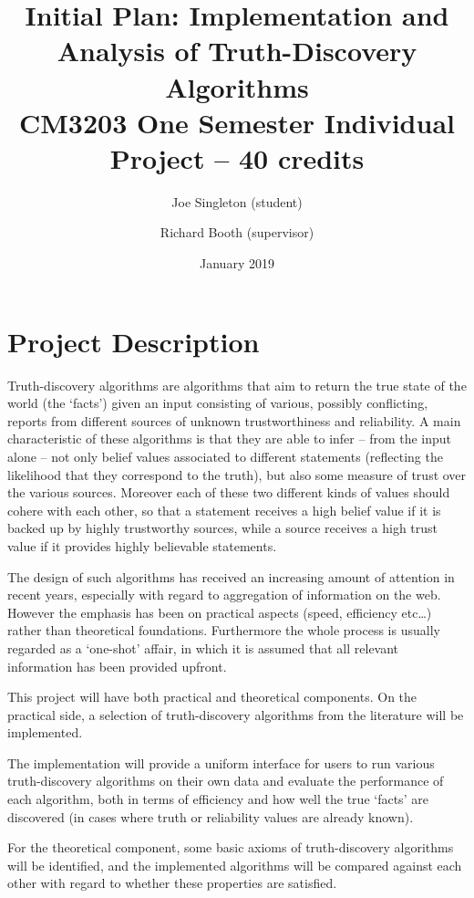 \documentclass{article}
\author{
    Joe Singleton (student)\\
    \and
    Richard Booth (supervisor)
}
\date{January 2019}
\title{
    Initial Plan: Implementation and Analysis of Truth-Discovery Algorithms\\
    \large CM3203 One Semester Individual Project -- 40 credits
}
\begin{document}
\maketitle

\section{Project Description}

Truth-discovery algorithms are algorithms that aim to return the true state of
the world (the `facts') given an input consisting of various, possibly
conflicting, reports from different sources of unknown trustworthiness and
reliability. A main characteristic of these algorithms is that they are able to
infer -- from the input alone -- not only belief values associated to different
statements (reflecting the likelihood that they correspond to the truth), but
also some measure of trust over the various sources. Moreover each of these two
different kinds of values should cohere with each other, so that a statement
receives a high belief value if it is backed up by highly trustworthy sources,
while a source receives a high trust value if it provides highly believable
statements.

The design of such algorithms has received an increasing amount of attention in
recent years, especially with regard to aggregation of information on the web.
However the emphasis has been on practical aspects (speed, efficiency
etc\ldots) rather than theoretical foundations. Furthermore the whole process
is usually regarded as a `one-shot' affair, in which it is assumed that all
relevant information has been provided upfront.

This project will have both practical and theoretical components. On the
practical side, a selection of truth-discovery algorithms from the literature
will be implemented.

The implementation will provide a uniform interface for users to run various
truth-discovery algorithms on their own data and evaluate the performance of
each algorithm, both in terms of efficiency and how well the true `facts' are
discovered (in cases where truth or reliability values are already known).

For the theoretical component, some basic axioms of truth-discovery algorithms
will be identified, and the implemented algorithms will be compared against
each other with regard to whether these properties are satisfied.
\end{document}
